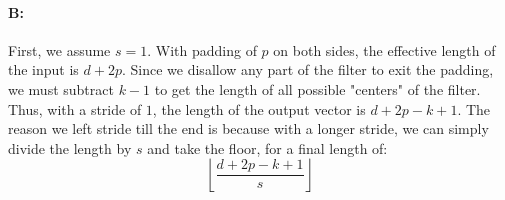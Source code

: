 \documentclass{article}
\begin{document}
\paragraph{B: } First, we assume $s=1$. With padding of $p$ on both sides, the effective length of the input is $d+2p$. Since we disallow any part of the filter to exit the padding, we must subtract $k-1$ to get the length of all possible "centers" of the filter. Thus, with a stride of $1$, the length of the output vector is $d+2p-k+1$. The reason we left stride till the end is because with a longer stride, we can simply divide the length by $s$ and take the floor, for a final length of: \newline
$$\left\lfloor \frac{d+2p-k+1}{s}\right\rfloor$$
\end{document}
